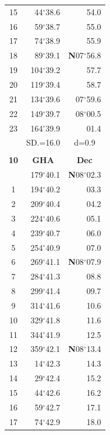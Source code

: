 \documentclass[10pt, a4paper]{report}
\begin{document}
\begin{scriptsize}
\begin{tabular*}{0.2\textwidth}[t]{@{\extracolsep{\fill}}|c|rr|}
15 & 44$^\circ$38.6 & \raisebox{0.24ex}{\boldmath$\cdot$~\boldmath$\cdot$~~}54.0\\
16 & 59$^\circ$38.7 & 55.0\\
17 & 74$^\circ$38.9 & 55.9\\[2Pt]
18 & 89$^\circ$39.1 & \textbf{N}07$^\circ$56.8\\
19 & 104$^\circ$39.2 & 57.7\\
20 & 119$^\circ$39.4 & 58.7\\
21 & 134$^\circ$39.6 & 07$^\circ$59.6\\
22 & 149$^\circ$39.7 & 08$^\circ$00.5\\
23 & 164$^\circ$39.9 & 01.4\\
\hline
\rule{0pt}{2.4ex} & \multicolumn{1}{c}{SD.=16.0} & \multicolumn{1}{c|}{d=0.9}\\
\hline
\multicolumn{1}{c}{}\\[-0.5ex]\hline
\multicolumn{1}{|c|}{\rule{0pt}{2.6ex}\textbf{10}} & \multicolumn{1}{c}{\textbf{GHA}} & \multicolumn{1}{c|}{\textbf{Dec}}\\
\hline\rule{0pt}{2.6ex}\noindent
0 & 179$^\circ$40.1 & \textbf{N}08$^\circ$02.3\\
1 & 194$^\circ$40.2 & 03.3\\
2 & 209$^\circ$40.4 & 04.2\\
3 & 224$^\circ$40.6 & \raisebox{0.24ex}{\boldmath$\cdot$~\boldmath$\cdot$~~}05.1\\
4 & 239$^\circ$40.7 & 06.0\\
5 & 254$^\circ$40.9 & 07.0\\[2Pt]
6 & 269$^\circ$41.1 & \textbf{N}08$^\circ$07.9\\
7 & 284$^\circ$41.3 & 08.8\\
8 & 299$^\circ$41.4 & 09.7\\
9 & 314$^\circ$41.6 & \raisebox{0.24ex}{\boldmath$\cdot$~\boldmath$\cdot$~~}10.6\\
10 & 329$^\circ$41.8 & 11.6\\
11 & 344$^\circ$41.9 & 12.5\\[2Pt]
12 & 359$^\circ$42.1 & \textbf{N}08$^\circ$13.4\\
13 & 14$^\circ$42.3 & 14.3\\
14 & 29$^\circ$42.4 & 15.2\\
15 & 44$^\circ$42.6 & \raisebox{0.24ex}{\boldmath$\cdot$~\boldmath$\cdot$~~}16.2\\
16 & 59$^\circ$42.7 & 17.1\\
17 & 74$^\circ$42.9 & 18.0\\[2Pt]

\end{tabular*}
\end{scriptsize}
\end{document}
